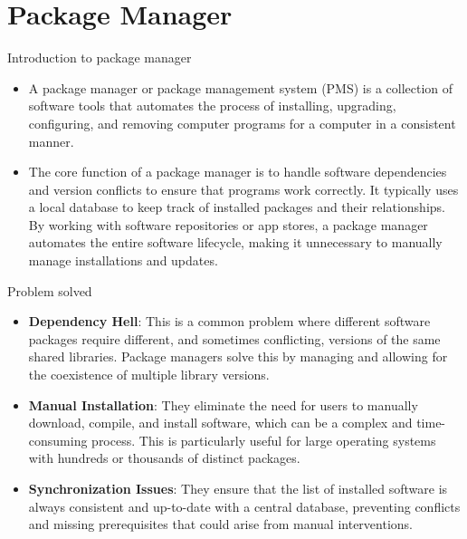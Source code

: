 \section{Package Manager}

\begin{frame}[fragile]{Introduction to package manager}
	\begin{itemize}
		\item A package manager or package management system (PMS) is a collection of software tools that automates the process of installing, upgrading, configuring, and removing computer programs for a computer in a consistent manner.
		\item The core function of a package manager is to handle software dependencies and version conflicts to ensure that programs work correctly. It typically uses a local database to keep track of installed packages and their relationships. By working with software repositories or app stores, a package manager automates the entire software lifecycle, making it unnecessary to manually manage installations and updates.
	\end{itemize}
\end{frame}

\begin{frame}[fragile]{Problem solved}
	\begin{itemize}
		\item \textbf{Dependency Hell}: This is a common problem where different software packages require different, and sometimes conflicting, versions of the same shared libraries. Package managers solve this by managing and allowing for the coexistence of multiple library versions.
		\item \textbf{Manual Installation}: They eliminate the need for users to manually download, compile, and install software, which can be a complex and time-consuming process. This is particularly useful for large operating systems with hundreds or thousands of distinct packages.
		\item \textbf{Synchronization Issues}: They ensure that the list of installed software is always consistent and up-to-date with a central database, preventing conflicts and missing prerequisites that could arise from manual interventions.
	\end{itemize}
\end{frame}

